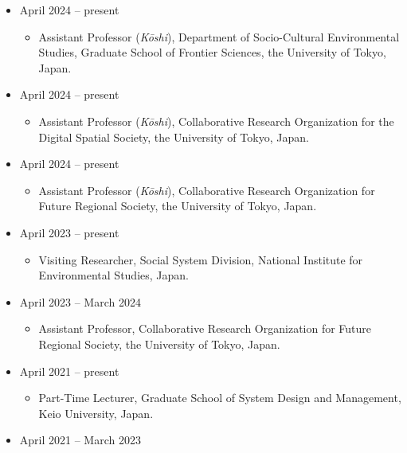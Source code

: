 \documentclass[
]{book}
\providecommand{\tightlist}{%
  \setlength{\itemsep}{0pt}\setlength{\parskip}{0pt}}
\begin{document}
\begin{itemize}
\tightlist
\item
  April 2024 -- present

  \begin{itemize}
  \tightlist
  \item
    Assistant Professor (\emph{Kōshi}),
    Department of Socio-Cultural Environmental Studies, Graduate School of Frontier Sciences, the University of Tokyo, Japan.
  \end{itemize}
\item
  April 2024 -- present

  \begin{itemize}
  \tightlist
  \item
    Assistant Professor (\emph{Kōshi}),
    Collaborative Research Organization for the Digital Spatial Society, the University of Tokyo, Japan.
  \end{itemize}
\item
  April 2024 -- present

  \begin{itemize}
  \tightlist
  \item
    Assistant Professor (\emph{Kōshi}),
    Collaborative Research Organization for Future Regional Society, the University of Tokyo, Japan.
  \end{itemize}
\item
  April 2023 -- present

  \begin{itemize}
  \tightlist
  \item
    Visiting Researcher,
    Social System Division, National Institute for Environmental Studies, Japan.
  \end{itemize}
\item
  April 2023 -- March 2024

  \begin{itemize}
  \tightlist
  \item
    Assistant Professor,
    Collaborative Research Organization for Future Regional Society, the University of Tokyo, Japan.
  \end{itemize}
\item
  April 2021 -- present

  \begin{itemize}
  \tightlist
  \item
    Part-Time Lecturer,
    Graduate School of System Design and Management, Keio University, Japan.
  \end{itemize}
\item
  April 2021 -- March 2023


\end{itemize}
\end{document}
